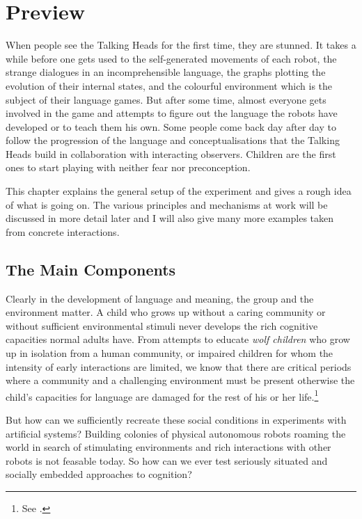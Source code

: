 \chapter{Preview}

\setcounter{foot}{1}
When people see the Talking Heads for the first time, they 
are stunned. It takes a while before
one gets used to the self-generated movements of each robot, 
the strange dialogues in an incomprehensible language, 
the graphs plotting the evolution of their internal
states, 
and the colourful environment which is the subject of their 
language games. But after some time, almost everyone gets involved 
in the game and attempts to figure out the language the robots
have developed or to teach them his own. 
Some people come back
day after day to follow the progression
of the language and conceptualisations that the Talking Heads 
build in collaboration with interacting observers.
Children are the first ones to 
start playing with neither fear nor preconception. 

This chapter explains the general setup of the 
experiment and gives a rough idea of what is going on. 
The various principles and mechanisms at work 
will be discussed in more detail later and I will also give many 
more examples taken from concrete interactions.

\section{The Main Components}

Clearly in the development of language and meaning, 
the group and the environment matter. A child 
who grows up without a caring 
community or without sufficient environmental stimuli
never develops the rich cognitive capacities 
normal adults have. From attempts to educate {\it wolf children}
who grow up in isolation from a human community, or 
impaired children for whom the intensity of early 
interactions are limited, we know that 
there are critical periods
where a community and a challenging environment must be
present otherwise the child's capacities for language
are damaged for the 
rest of his or her life.\footnote{See \cite{Tager:1994}.}

But how can we sufficiently 
recreate these social conditions in experiments 
with artificial systems? 
Building colonies of physical autonomous robots
roaming the world in search of stimulating 
environments and rich interactions with
other robots is not feasable today. So how 
can we ever test seriously situated and 
socially embedded approaches to cognition? 

